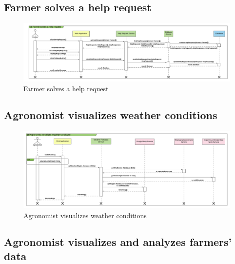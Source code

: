 \subsection{Farmer solves a help request}

\newpage
\begin{landscape}
\begin{figure}[h]
\vspace*{-2cm}
\noindent
\centering
\centerline{\includegraphics[scale= 0.108]{./Images/Sequence diagram/Farmer solves a help request.png}}
    \caption {Farmer solves a help request}
    \vspace*{-12cm}
\end{figure}
\fillandplacepagenumber
\end{landscape}

\subsection{Agronomist visualizes weather conditions}

\newpage
\begin{landscape}
\begin{figure}[h]
\vspace*{-2cm}
\noindent
\centering
\centerline{\includegraphics[scale= 0.108]{./Images/Sequence diagram/Agronomist visualizes weather conditions.png}}
    \caption{Agronomist visualizes weather conditions}
    \vspace*{-12cm}
\end{figure}
\fillandplacepagenumber
\end{landscape}

\subsection{Agronomist visualizes and analyzes farmers' data}

